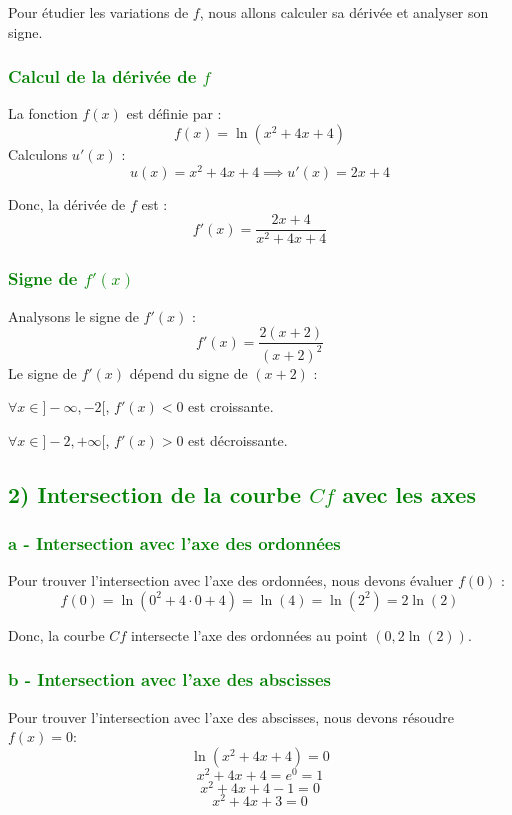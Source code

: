 \documentclass[12pt]{article}
\begin{document}
Pour étudier les variations de \( f \), nous allons calculer sa dérivée et analyser son signe.

\subsubsection*{\textcolor{green}{Calcul de la dérivée de \( f \)}}
La fonction \( f(x) \) est définie par :
\[
f(x) = \ln(x^2 + 4x + 4)
\]
Calculons \( u'(x) \) :
\[
u(x) = x^2 + 4x + 4 \implies u'(x) = 2x + 4
\]

Donc, la dérivée de \( f \) est :
\[
f'(x) = \frac{2x + 4}{x^2 + 4x + 4}
\]

\subsubsection*{\textcolor{green}{Signe de \( f'(x) \)}}
Analysons le signe de \( f'(x) \) :
\[
f'(x) = \frac{2(x + 2)}{(x + 2)^2}
\]
Le signe de \( f'(x) \) dépend du signe de \( (x + 2) \) :

\(\forall x \in ]-\infty, -2[ \), \( f'(x) < 0 \) est croissante.

\(\forall x \in ]-2, +\infty[ \), \( f'(x) > 0 \) est décroissante.

\subsection*{\textcolor{green}{2) Intersection de la courbe \( Cf \) avec les axes}}

\subsubsection*{\textcolor{green}{a - Intersection avec l'axe des ordonnées}}

Pour trouver l'intersection avec l'axe des ordonnées, nous devons évaluer \( f(0) \) :
\[
f(0) = \ln(0^2 + 4 \cdot 0 + 4) = \ln(4) = \ln(2^2) = 2 \ln(2)
\]

Donc, la courbe \( Cf \) intersecte l'axe des ordonnées au point \((0, 2\ln(2))\).

\subsubsection*{\textcolor{green}{b - Intersection avec l'axe des abscisses}}

Pour trouver l'intersection avec l'axe des abscisses, nous devons résoudre \( f(x) = 0 \):
\[
\ln(x^2 + 4x + 4) = 0
\]
\[
x^2 + 4x + 4 = e^0 = 1
\]
\[
x^2 + 4x + 4 - 1 = 0
\]
\[
x^2 + 4x + 3 = 0
\]
\end{document}
